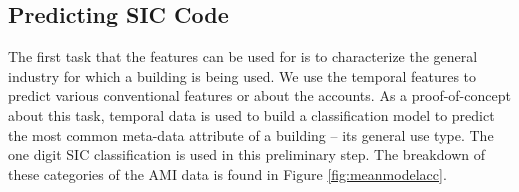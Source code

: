 \subsection{Predicting SIC Code}
\label{sec:predictinsiccode}

The first task that the features can be used for is to characterize the general industry for which a building is being used. We use the temporal features to predict various conventional features or about the accounts. As a proof-of-concept about this task, temporal data is used to build a classification model to predict the most common meta-data attribute of a building – its general use type. The one digit SIC classification is used in this preliminary step. The breakdown of these categories of the AMI data is found in Figure \ref{fig:meanmodelacc}.




